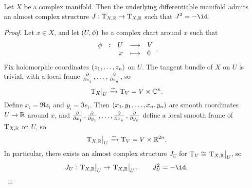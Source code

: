
\begin{proposition}
Let $ X $ be a complex manifold. Then the underlying differentiable manifold admits an almost complex structure $ J : \mathrm{T}_{X, \mathbb{R}} \to \mathrm{T}_{X, \mathbb{R}} $ such that $ J^2 = -\id $.
\end{proposition}

\begin{proof}
Let $ x \in X $, and let $ \br{U, \phi} $ be a complex chart around $ x $ such that
$$ \function[\phi]{U}{V}{x}{0}. $$
Fix holomorphic coordinates $ \br{z_1, \dots, z_n} $ on $ U $. The tangent bundle of $ X $ on $ U $ is trivial, with a local frame $ \tpd{}{z_1}, \dots, \tpd{}{z_n} $, so
$$ \left. \mathrm{T}_X \right|_U \xrightarrow{\sim} \mathrm{T}_V = V \times \mathbb{C}^n. $$
Define $ x_i = \Re z_i $ and $ y_i = \Im e_i $. Then $ \br{x_1, y_1, \dots, x_n, y_n} $ are smooth coordinates $ U \to \mathbb{R} $ around $ x $, and $ \tpd{}{x_1}, \tpd{}{y_1}, \dots, \tpd{}{x_n}, \tpd{}{y_n} $ define a local smooth frame of $ \mathrm{T}_{X, \mathbb{R}} $ on $ U $, so
$$ \left. \mathrm{T}_{X, \mathbb{R}} \right|_U \xrightarrow{\sim} \mathrm{T}_V = V \times \mathbb{R}^{2n}. $$
In particular, there exists an almost complex structure $ J_U $ for $ \mathrm{T}_V \cong \left. \mathrm{T}_{X, \mathbb{R}} \right|_U $, so
$$ J_U : \eval{\T_{X, \RR}}_U \to \eval{\T_{X, \RR}}_U, \qquad J_U^2 = -\id. $$

\pagebreak


\end{proof}
